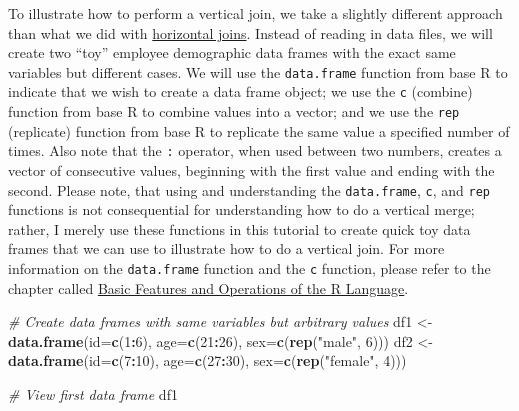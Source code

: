 \documentclass[]{book}
\newenvironment{Shaded}{\begin{snugshade}}{\end{snugshade}}
\newcommand{\KeywordTok}[1]{\textcolor[rgb]{0.13,0.29,0.53}{\textbf{#1}}}
\newcommand{\DataTypeTok}[1]{\textcolor[rgb]{0.13,0.29,0.53}{#1}}
\newcommand{\DecValTok}[1]{\textcolor[rgb]{0.00,0.00,0.81}{#1}}
\newcommand{\StringTok}[1]{\textcolor[rgb]{0.31,0.60,0.02}{#1}}
\newcommand{\CommentTok}[1]{\textcolor[rgb]{0.56,0.35,0.01}{\textit{#1}}}
\newcommand{\OperatorTok}[1]{\textcolor[rgb]{0.81,0.36,0.00}{\textbf{#1}}}
\newcommand{\NormalTok}[1]{#1}
\begin{document}
To illustrate how to perform a vertical join, we take a slightly
different approach than what we did with
\protect\hyperlink{horizontaljoin}{horizontal joins}. Instead of reading
in data files, we will create two ``toy'' employee demographic data
frames with the exact same variables but different cases. We will use
the \texttt{data.frame} function from base R to indicate that we wish to
create a data frame object; we use the \texttt{c} (combine) function
from base R to combine values into a vector; and we use the \texttt{rep}
(replicate) function from base R to replicate the same value a specified
number of times. Also note that the \texttt{:} operator, when used
between two numbers, creates a vector of consecutive values, beginning
with the first value and ending with the second. Please note, that using
and understanding the \texttt{data.frame}, \texttt{c}, and \texttt{rep}
functions is not consequential for understanding how to do a vertical
merge; rather, I merely use these functions in this tutorial to create
quick toy data frames that we can use to illustrate how to do a vertical
join. For more information on the \texttt{data.frame} function and the
\texttt{c} function, please refer to the chapter called
\protect\hyperlink{gentleintro}{Basic Features and Operations of the R
Language}.

\begin{Shaded}
\begin{Highlighting}[]
\CommentTok{# Create data frames with same variables but arbitrary values}
\NormalTok{df1 <-}\StringTok{ }\KeywordTok{data.frame}\NormalTok{(}\DataTypeTok{id=}\KeywordTok{c}\NormalTok{(}\DecValTok{1}\OperatorTok{:}\DecValTok{6}\NormalTok{), }\DataTypeTok{age=}\KeywordTok{c}\NormalTok{(}\DecValTok{21}\OperatorTok{:}\DecValTok{26}\NormalTok{), }\DataTypeTok{sex=}\KeywordTok{c}\NormalTok{(}\KeywordTok{rep}\NormalTok{(}\StringTok{"male"}\NormalTok{, }\DecValTok{6}\NormalTok{)))}
\NormalTok{df2 <-}\StringTok{ }\KeywordTok{data.frame}\NormalTok{(}\DataTypeTok{id=}\KeywordTok{c}\NormalTok{(}\DecValTok{7}\OperatorTok{:}\DecValTok{10}\NormalTok{), }\DataTypeTok{age=}\KeywordTok{c}\NormalTok{(}\DecValTok{27}\OperatorTok{:}\DecValTok{30}\NormalTok{), }\DataTypeTok{sex=}\KeywordTok{c}\NormalTok{(}\KeywordTok{rep}\NormalTok{(}\StringTok{"female"}\NormalTok{, }\DecValTok{4}\NormalTok{)))}
\end{Highlighting}
\end{Shaded}

\begin{Shaded}
\begin{Highlighting}[]
\CommentTok{# View first data frame}
\NormalTok{df1}
\end{Highlighting}
\end{Shaded}
\end{document}

